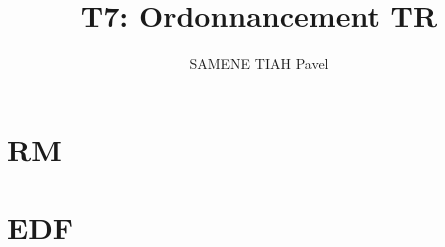 \documentclass{article}
\author{SAMENE TIAH Pavel}
\title{T7: Ordonnancement TR}
\begin{document}
\maketitle

\section{RM}


\section{EDF}


\end{document}
